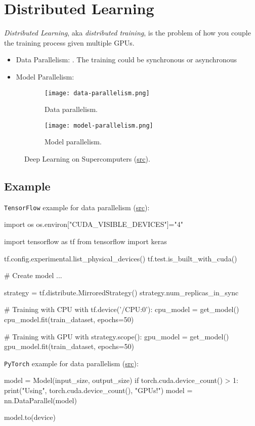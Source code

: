 \section{Distributed Learning}
\textit{Distributed Learning}, \ac{aka} \textit{distributed training}, is the problem of how you couple the training process given multiple \ac{GPU}s.

\begin{itemize}
	\item Data Parallelism: . The training could be synchronous or asynchronous
	\item Model Parallelism: 
\end{itemize}

\begin{figure}[hbt!]
	\centering
	\begin{subfigure}[b]{0.4\textwidth}
		\centering
		\texttt{[image: data-parallelism.png]}
		\caption{Data parallelism.}
		\label{fig:data-parallelism}
	\end{subfigure}
	\hfill
	\begin{subfigure}[b]{0.45\textwidth}
		\centering
		\texttt{[image: model-parallelism.png]}
		\caption{Model parallelism.}
		\label{fig:model-parallelism}
	\end{subfigure}
	\caption{Deep Learning on Supercomputers (\href{https://towardsdatascience.com/deep-learning-on-supercomputers-96319056c61f}{src}).}
\end{figure}

\subsection{Example}
\texttt{TensorFlow} example for data parallelism (\href{https://github.com/codebasics/deep-learning-keras-tf-tutorial/tree/master/43_distributed_training}{src}):
\begin{python}
import os
os.environ["CUDA_VISIBLE_DEVICES"]="4"

import tensorflow as tf
from tensorflow import keras

tf.config.experimental.list_physical_devices()
tf.test.is_built_with_cuda()

# Create model
...

strategy = tf.distribute.MirroredStrategy()
strategy.num_replicas_in_sync

# Training with CPU
with tf.device('/CPU:0'):
	cpu_model = get_model()
	cpu_model.fit(train_dataset, epochs=50)
	
# Training with GPU
with strategy.scope():
	gpu_model = get_model()
	gpu_model.fit(train_dataset, epochs=50)
\end{python}

\texttt{PyTorch} example for data parallelism (\href{https://pytorch.org/tutorials/beginner/blitz/data_parallel_tutorial.html}{src}):
\begin{python}
model = Model(input_size, output_size)
if torch.cuda.device_count() > 1:
	print("Using", torch.cuda.device_count(), "GPUs!")
	model = nn.DataParallel(model)
	
model.to(device)
\end{python}
